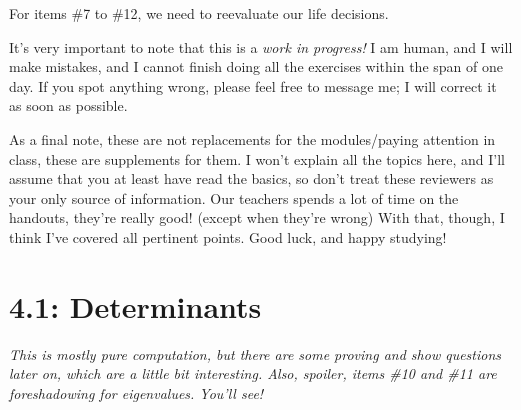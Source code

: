 \documentclass{article}
\begin{document}
    \colorbox{CornflowerBlue!50}{
    \begin{minipage}[c]{0.9\textwidth}
        \centering
        For items \#7 to \#12, we need to reevaluate our life decisions.
    \end{minipage}
    }\parindent=0pt \par 
It's very important to note that this is a \textit{work in progress!} I am human, and I will make mistakes, and I cannot finish doing all the exercises within the span of one day. If you spot anything wrong, 
please feel free to message me; I will correct it as soon as possible.\par
As a final note, these are not replacements for the modules/paying attention in class, these are supplements for them. I won't explain all the topics here, and I'll assume that you at least have 
read the basics, so don't treat these reviewers as your only source of information. Our teachers spends a lot of time on the handouts, they're really good! (except when they're wrong) With that, though, I think 
I've covered all pertinent points. Good luck, and happy studying!
\pagebreak 

\section*{4.1: Determinants }
\textit{This is mostly pure computation, but there are some proving and show questions later on, which are a little bit interesting. Also, spoiler, items \#10 and \#11 are foreshadowing for 
eigenvalues. You'll see!}
\end{document}

